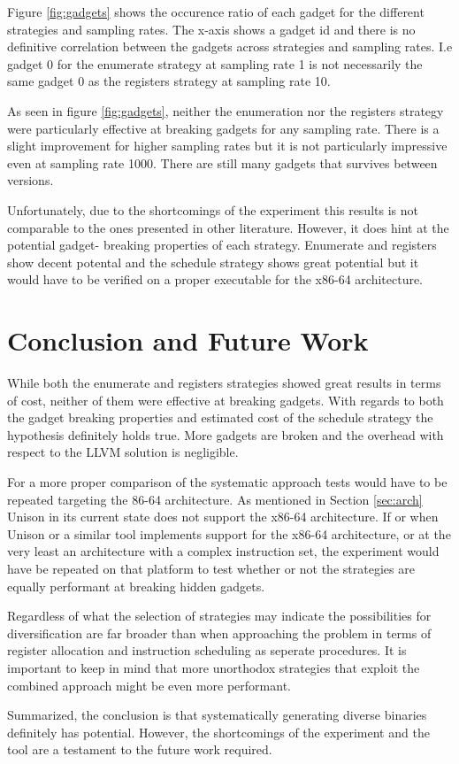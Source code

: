 Figure \ref{fig:gadgets} shows the occurence ratio of each gadget for the different
strategies and sampling rates. The x-axis shows a gadget id and there is no definitive
correlation between the gadgets across strategies and sampling rates. I.e gadget 0 for the
enumerate strategy at sampling rate 1 is not necessarily the same gadget 0 as the registers
strategy at sampling rate 10.

As seen in figure \ref{fig:gadgets}, neither the enumeration nor the registers strategy
were particularly effective at breaking gadgets for any sampling rate. There is a slight
improvement for higher sampling rates but it is not particularly impressive even at
sampling rate 1000. There are still many gadgets that survives between versions.

Unfortunately, due to the shortcomings of the experiment this results is not comparable to
the ones presented in other literature. However, it does hint at the potential gadget-
breaking properties of each strategy. Enumerate and registers show decent potental and the
schedule strategy shows great potential but it would have to be verified on a proper
executable for the x86-64 architecture.

\section{Conclusion and Future Work}


While both the enumerate and registers strategies showed great results in terms of cost,
neither of them were effective at breaking gadgets. With regards to both the gadget
breaking properties and estimated cost of the schedule strategy the hypothesis definitely
holds true. More gadgets are broken and the overhead with respect to the LLVM solution
is negligible.

For a more proper comparison of the systematic approach tests would have to be repeated
targeting the 86-64 architecture. As mentioned in Section \ref{sec:arch} Unison in its
current state does not support the x86-64 architecture. If or when Unison or a similar
tool implements support for the x86-64 architecture, or at the very least an architecture
with a complex instruction set, the experiment would have be repeated on that platform to
test whether or not the strategies are equally performant at breaking hidden gadgets.


Regardless of what the selection of strategies may indicate the possibilities for
diversification are far broader than when approaching the problem in terms of register
allocation and instruction scheduling as seperate procedures. It is important to keep in
mind that more unorthodox strategies that exploit the combined approach might be even
more performant.

Summarized, the conclusion is that systematically generating diverse binaries definitely
has potential. However, the shortcomings of the experiment and the tool are a testament to
the future work required.
